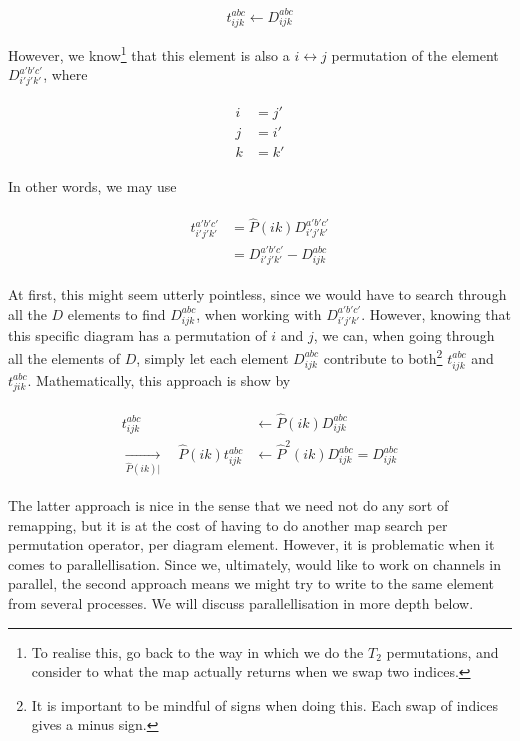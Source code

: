 \documentclass[10pt,twoside]{report}
\begin{document}
	\begin{equation}
		t_{ijk}^{abc} \leftarrow D_{ijk}^{abc}
	\end{equation}
	
	However, we know\footnote{To realise this, go back to the way in which we do the $T_2$ permutations, and consider to what the map actually returns when we swap two indices.} that this element is also a $i\leftrightarrow j$ permutation of the element $D_{i'j'k'}^{a'b'c'}$, where
	
	\begin{align}
	\begin{split}
	i &= j' \\
	j &= i' \\
	k &= k'
	\end{split}
	\end{align}
	
	In other words, we may use
	
	\begin{align}
		\begin{split}
		t_{i'j'k'}^{a'b'c'} &= \hat{P}(ik)D_{i'j'k'}^{a'b'c'} \\
		&= D_{i'j'k'}^{a'b'c'} - D_{ijk}^{abc}
		\end{split}
	\end{align}
	
	At first, this might seem utterly pointless, since we would have to search through all the $D$ elements to find $D_{ijk}^{abc}$, when working with $D_{i'j'k'}^{a'b'c'}$. However, knowing that this specific diagram has a permutation of $i$ and $j$, we can, when going through all the elements of $D$, simply let each element $D_{ijk}^{abc}$ contribute to both\footnote{It is important to be mindful of signs when doing this. Each swap of indices gives a minus sign.} $t_{ijk}^{abc}$ and $t_{jik}^{abc}$. Mathematically, this approach is show by
	
	\begin{align}
		\begin{split}
			t_{ijk}^{abc} &\leftarrow \hat{P}(ik) D_{ijk}^{abc} \\
			\underset{\hat{P}(ik)\big|}{\longrightarrow}\quad \hat{P}(ik)t_{ijk}^{abc} &\leftarrow \hat{P}^2(ik)D_{ijk}^{abc} = D_{ijk}^{abc}
		\end{split}
	\end{align}
	
	The latter approach is nice in the sense that we need not do any sort of remapping, but it is at the cost of having to do another map search per permutation operator, per diagram element. However, it is problematic when it comes to parallellisation. Since we, ultimately, would like to work on channels in parallel, the second approach means we might try to write to the same element from several processes. We will discuss parallellisation in more depth below.
	
\end{document}
